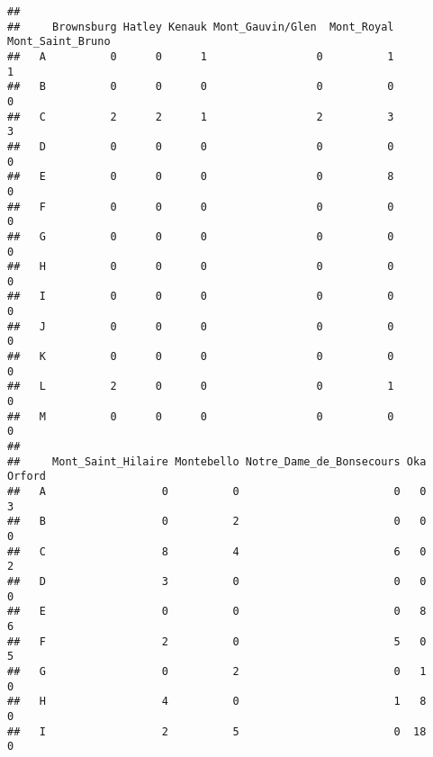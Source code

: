 \documentclass[
]{article}
\newenvironment{Shaded}{\begin{snugshade}}{\end{snugshade}}
\newcommand{\CommentTok}[1]{\textcolor[rgb]{0.56,0.35,0.01}{\textit{#1}}}
\newcommand{\FunctionTok}[1]{\textcolor[rgb]{0.13,0.29,0.53}{\textbf{#1}}}
\newcommand{\NormalTok}[1]{#1}
\newcommand{\SpecialCharTok}[1]{\textcolor[rgb]{0.81,0.36,0.00}{\textbf{#1}}}
\begin{document}
\begin{Shaded}
\end{Shaded}

\begin{verbatim}
##    
##     Brownsburg Hatley Kenauk Mont_Gauvin/Glen  Mont_Royal Mont_Saint_Bruno
##   A          0      0      1                 0          1                1
##   B          0      0      0                 0          0                0
##   C          2      2      1                 2          3                3
##   D          0      0      0                 0          0                0
##   E          0      0      0                 0          8                0
##   F          0      0      0                 0          0                0
##   G          0      0      0                 0          0                0
##   H          0      0      0                 0          0                0
##   I          0      0      0                 0          0                0
##   J          0      0      0                 0          0                0
##   K          0      0      0                 0          0                0
##   L          2      0      0                 0          1                0
##   M          0      0      0                 0          0                0
##    
##     Mont_Saint_Hilaire Montebello Notre_Dame_de_Bonsecours Oka Orford
##   A                  0          0                        0   0      3
##   B                  0          2                        0   0      0
##   C                  8          4                        6   0      2
##   D                  3          0                        0   0      0
##   E                  0          0                        0   8      6
##   F                  2          0                        5   0      5
##   G                  0          2                        0   1      0
##   H                  4          0                        1   8      0
##   I                  2          5                        0  18      0

\end{verbatim}
\end{document}

